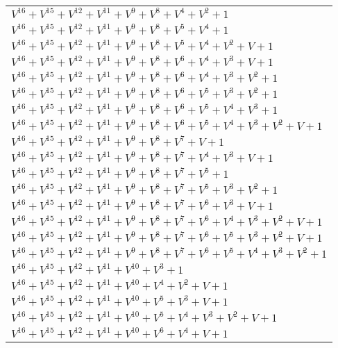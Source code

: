 \documentclass[12pt]{article}
\begin{document}
\begin{adjustwidth}{-4cm}{}
\begin{center}
\begin{longtable}{|l|}
$V^{16}  +V^{15}  +V^{12}  +V^{11}  +V^{9}  +V^{8}  +V^{4}  +V^{2}  + 1$ \\
$V^{16}  +V^{15}  +V^{12}  +V^{11}  +V^{9}  +V^{8}  +V^{5}  +V^{4}  + 1$ \\
$V^{16}  +V^{15}  +V^{12}  +V^{11}  +V^{9}  +V^{8}  +V^{5}  +V^{4}  +V^{2}  + V + 1$ \\
$V^{16}  +V^{15}  +V^{12}  +V^{11}  +V^{9}  +V^{8}  +V^{6}  +V^{4}  +V^{3}  + V + 1$ \\
$V^{16}  +V^{15}  +V^{12}  +V^{11}  +V^{9}  +V^{8}  +V^{6}  +V^{4}  +V^{3}  +V^{2}  + 1$ \\
$V^{16}  +V^{15}  +V^{12}  +V^{11}  +V^{9}  +V^{8}  +V^{6}  +V^{5}  +V^{3}  +V^{2}  + 1$ \\
$V^{16}  +V^{15}  +V^{12}  +V^{11}  +V^{9}  +V^{8}  +V^{6}  +V^{5}  +V^{4}  +V^{3}  + 1$ \\
$V^{16}  +V^{15}  +V^{12}  +V^{11}  +V^{9}  +V^{8}  +V^{6}  +V^{5}  +V^{4}  +V^{3}  +V^{2}  + V + 1$ \\
$V^{16}  +V^{15}  +V^{12}  +V^{11}  +V^{9}  +V^{8}  +V^{7}  + V + 1$ \\
$V^{16}  +V^{15}  +V^{12}  +V^{11}  +V^{9}  +V^{8}  +V^{7}  +V^{4}  +V^{3}  + V + 1$ \\
$V^{16}  +V^{15}  +V^{12}  +V^{11}  +V^{9}  +V^{8}  +V^{7}  +V^{5}  + 1$ \\
$V^{16}  +V^{15}  +V^{12}  +V^{11}  +V^{9}  +V^{8}  +V^{7}  +V^{5}  +V^{3}  +V^{2}  + 1$ \\
$V^{16}  +V^{15}  +V^{12}  +V^{11}  +V^{9}  +V^{8}  +V^{7}  +V^{6}  +V^{3}  + V + 1$ \\
$V^{16}  +V^{15}  +V^{12}  +V^{11}  +V^{9}  +V^{8}  +V^{7}  +V^{6}  +V^{4}  +V^{3}  +V^{2}  + V + 1$ \\
$V^{16}  +V^{15}  +V^{12}  +V^{11}  +V^{9}  +V^{8}  +V^{7}  +V^{6}  +V^{5}  +V^{3}  +V^{2}  + V + 1$ \\
$V^{16}  +V^{15}  +V^{12}  +V^{11}  +V^{9}  +V^{8}  +V^{7}  +V^{6}  +V^{5}  +V^{4}  +V^{3}  +V^{2}  + 1$ \\
$V^{16}  +V^{15}  +V^{12}  +V^{11}  +V^{10}  +V^{3}  + 1$ \\
$V^{16}  +V^{15}  +V^{12}  +V^{11}  +V^{10}  +V^{4}  +V^{2}  + V + 1$ \\
$V^{16}  +V^{15}  +V^{12}  +V^{11}  +V^{10}  +V^{5}  +V^{3}  + V + 1$ \\
$V^{16}  +V^{15}  +V^{12}  +V^{11}  +V^{10}  +V^{5}  +V^{4}  +V^{3}  +V^{2}  + V + 1$ \\
$V^{16}  +V^{15}  +V^{12}  +V^{11}  +V^{10}  +V^{6}  +V^{4}  + V + 1$ \\

\end{longtable}
\end{center}
\end{adjustwidth}
\end{document}
